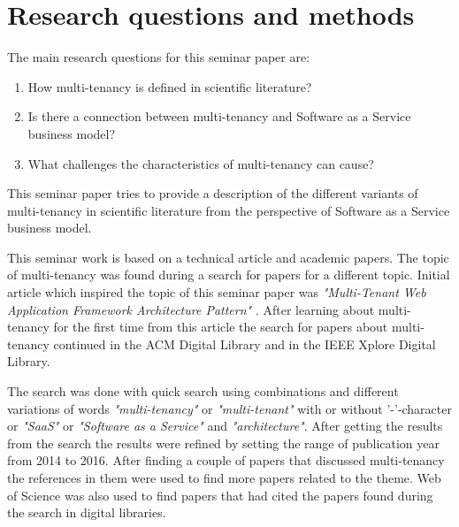 \documentclass[conference]{sasmoota2017}
\begin{document}



\section{Research questions and methods}

The main research questions for this seminar paper are: 
\begin{enumerate}
\item How multi-tenancy is defined in scientific literature?
\item Is there a connection between multi-tenancy and Software as a Service business model?
\item What challenges the characteristics of multi-tenancy can cause?
\end{enumerate}
This seminar paper tries to provide a description of the different variants of multi-tenancy in scientific literature from the perspective of Software as a Service business model. 

This seminar work is based on a technical article and academic papers. The topic of multi-tenancy was found during a search for papers for a different topic. Initial article which inspired the topic of this seminar paper was \textit{"Multi-Tenant Web Application Framework Architecture Pattern"} \cite{Bien:2015:MultiTenantWebApp}. After learning about multi-tenancy for the first time from this article the search for papers about multi-tenancy continued in the ACM Digital Library and in the IEEE Xplore Digital Library. 

The search was done with quick search using combinations and different variations of words \textit{"multi-tenancy"} or \textit{"multi-tenant"} with or without '-'-character or \textit{"SaaS"} or \textit{"Software as a Service"} and \textit{"architecture"}. After getting the results from the search the results were refined by setting the range of publication year from 2014 to 2016. After finding a couple of papers that discussed multi-tenancy the references in them were used to find more papers related to the theme. Web of Science was also used to find papers that had cited the papers found during the search in digital libraries.
\end{document}
